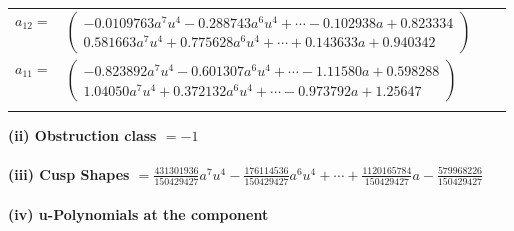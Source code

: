 \documentclass[1p]{elsarticle_modified}
\theoremstyle{definition}
\begin{document}
\begin{tabular}{m{7pt} m{180pt} m{7pt} m{180pt} }
\flushright $a_{12}=$&$\begin{pmatrix}-0.0109763 a^{7} u^{4}-0.288743 a^{6} u^{4}+\cdots-0.102938 a+0.823334\\0.581663 a^{7} u^{4}+0.775628 a^{6} u^{4}+\cdots+0.143633 a+0.940342\end{pmatrix}$ \\
\flushright $a_{11}=$&$\begin{pmatrix}-0.823892 a^{7} u^{4}-0.601307 a^{6} u^{4}+\cdots-1.11580 a+0.598288\\1.04050 a^{7} u^{4}+0.372132 a^{6} u^{4}+\cdots-0.973792 a+1.25647\end{pmatrix}$\\&\end{tabular}
\flushleft \textbf{(ii) Obstruction class $= -1$}\\~\\
\flushleft \textbf{(iii) Cusp Shapes $= \frac{431301936}{150429427} a^7 u^4-\frac{176114536}{150429427} a^6 u^4+\cdots+\frac{1120165784}{150429427} a-\frac{579968226}{150429427}$}\\~\\
\newpage\renewcommand{\arraystretch}{1}
\flushleft \textbf{(iv) u-Polynomials at the component}\newline \\
\end{document}
